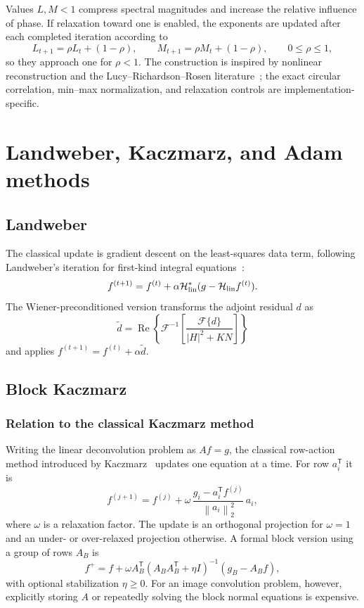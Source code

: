 \documentclass[10pt,a4paper]{article}
\newcommand{\calF}{\mathcal{F}}
\newcommand{\norm}[1]{\left\lVert #1\right\rVert}
\begin{document}
Values $L,M<1$ compress spectral magnitudes and increase the relative influence of phase. If relaxation toward one is enabled, the exponents are updated after each completed iteration according to
\[
L_{t+1}=\rho L_t+(1-\rho),\qquad
M_{t+1}=\rho M_t+(1-\rho),\qquad 0\leq\rho\leq1,
\]
so they approach one for $\rho<1$. The construction is inspired by nonlinear reconstruction and the Lucy--Richardson--Rosen literature~\cite{Smith2022,Anand2022}; the exact circular correlation, min--max normalization, and relaxation controls are implementation-specific.

\section{Landweber, Kaczmarz, and Adam methods}
\subsection{Landweber}
The classical update is gradient descent on the least-squares data term, following Landweber's iteration for first-kind integral equations~\cite{Landweber1951}:
\begin{equation}
f^{(t+1)}=f^{(t)}+\alpha\mathcal{H}_{\rm lin}^{*}(g-\mathcal{H}_{\rm lin}f^{(t)}).
\end{equation}
The Wiener-preconditioned version transforms the adjoint residual $d$ as
\begin{equation}
\widetilde d=\operatorname{Re}\left\{\calF^{-1}\left[\frac{\calF\{d\}}{|H|^2+KN}\right]\right\}
\end{equation}
and applies $f^{(t+1)}=f^{(t)}+\alpha\widetilde d$.

\subsection{Block Kaczmarz}
\subsubsection*{Relation to the classical Kaczmarz method}
Writing the linear deconvolution problem as $Af=g$, the classical row-action method introduced by Kaczmarz~\cite{Kaczmarz1937} updates one equation at a time. For row $a_i^{\mathsf T}$ it is
\begin{equation}
f^{(j+1)}=f^{(j)}+\omega\,
\frac{g_i-a_i^{\mathsf T}f^{(j)}}{\norm{a_i}_2^2}\,a_i,
\end{equation}
where $\omega$ is a relaxation factor. The update is an orthogonal projection for $\omega=1$ and an under- or over-relaxed projection otherwise. A formal block version using a group of rows $A_B$ is
\begin{equation}
f^{+}=f+\omega A_B^{\mathsf T}
\left(A_BA_B^{\mathsf T}+\eta I\right)^{-1}(g_B-A_Bf),
\end{equation}
with optional stabilization $\eta\geq0$. For an image convolution problem, however, explicitly storing $A$ or repeatedly solving the block normal equations is expensive.
\end{document}

